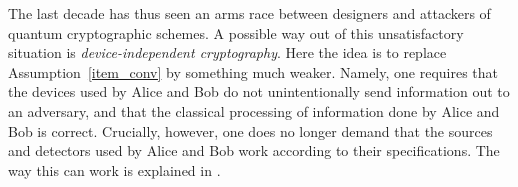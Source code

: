 The last decade has thus seen an arms race between designers and attackers of quantum cryptographic schemes. A possible way out of this unsatisfactory situation is \emph{device-independent cryptography}. Here the idea is to replace Assumption~\ref{item_conv} by something much weaker. Namely, one requires that the devices used by Alice and Bob do not unintentionally send information out to an adversary, and that the classical processing of information done by Alice and Bob is correct. Crucially, however,  one does no longer demand that the sources and detectors used by Alice and Bob work according to their specifications. The way this can work is explained in . 

